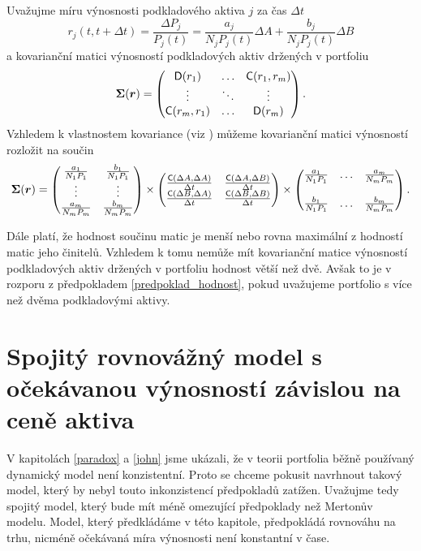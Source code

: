 \documentclass[a4paper,12pt]{report}
\theoremstyle{definition} \newtheorem{definice}[veta]{Definice}
\theoremstyle{remark}
\begin{document}
Uvažujme míru výnosnosti podkladového aktiva $j$ za čas $\Delta t$
\begin{displaymath}
r_j(t,t+\Delta t)=\frac{\Delta P_j}{P_j(t)}=\frac{a_j}{N_jP_j(t)}\Delta A + \frac{b_j}{N_jP_j(t)}\Delta B
\end{displaymath}
a kovarianční matici výnosností podkladových aktiv držených v portfoliu
$$\boldsymbol{\Sigma}(\boldsymbol{r})=
\begin{pmatrix}
\mathsf{D}(r_1)  & \ldots & \mathsf{C}(r_1,r_m)  \cr \vdots & \ddots & \vdots\cr \mathsf{C}(r_m,r_1)   & \ldots & \mathsf{D}(r_m) 
\end{pmatrix}.$$
Vzhledem k vlastnostem kovariance (viz \cite{andel}) můžeme kovarianční matici výnosností rozložit na součin 
$$
\boldsymbol{\Sigma}(\boldsymbol{r})= 
\begin{pmatrix}
\frac{a_1}{N_1P_1} & \frac{b_1}{N_1P_1}\cr \vdots & \vdots\cr \frac{a_m}{N_mP_m} & \frac{b_m}{N_mP_m}
\end{pmatrix}
\times
\begin{pmatrix}
\frac{\mathsf{C}(\Delta A, \Delta A)}{\Delta t} &
\frac{\mathsf{C}(\Delta A, \Delta B)}{\Delta t} \cr
\frac{\mathsf{C}(\Delta B, \Delta A)}{\Delta t} & \frac{\mathsf{C}(\Delta B,
\Delta B)}{\Delta t} 
\end{pmatrix}
\times
\begin{pmatrix}
\frac{a_1}{N_1P_1} & \ldots & \frac{a_m}{N_mP_m}\cr \cr \frac{b_1}{N_1P_1} & \ldots &
\frac{b_m}{N_mP_m}
\end{pmatrix}.
$$

Dále platí, že hodnost součinu matic je menší nebo rovna maximální z hodností matic jeho činitelů.
Vzhledem k tomu nemůže mít kovarianční matice výnosností podkladových aktiv držených v portfoliu hodnost větší než dvě.
Avšak to je v rozporu z předpokladem \ref{predpoklad_hodnost}, pokud uvažujeme portfolio s více než dvěma podkladovými aktivy.


\section{Spojitý rovnovážný model s očekávanou výnos\-ností závislou na ceně aktiva }
V kapitolách \ref{paradox} a \ref{john} jsme ukázali, že v teorii portfolia běžně používaný dynamický model není konzistentní.
Proto se chceme pokusit navrhnout takový model, který by nebyl touto inkonzistencí předpokladů zatížen.
Uvažujme tedy spojitý model, který bude mít méně omezující předpoklady než Mertonův modelu.
Model, který předkládáme v této kapitole, předpokládá rovnováhu na trhu, nicméně očekávaná míra výnosnosti není konstantní v čase.
\end{document}
